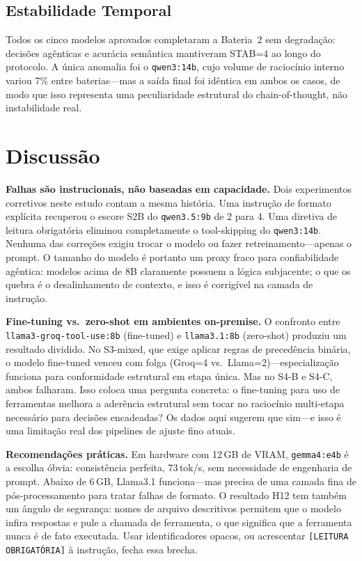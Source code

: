 \documentclass{kdmile}
\begin{document}
\subsection{Estabilidade Temporal}

Todos os cinco modelos aprovados completaram a Bateria~2 sem degradação:
decisões agênticas e acurácia semântica mantiveram STAB=4 ao longo do protocolo.
A única anomalia foi o \texttt{qwen3:14b}, cujo volume de raciocínio interno
variou 7\% entre baterias—\allowbreak mas a saída final foi idêntica em ambos os casos,
de modo que isso representa uma peculiaridade estrutural do chain-of-thought,
não instabilidade real.

\section{Discussão}
\label{sec:discussion}

\textbf{Falhas são instrucionais, não baseadas em capacidade.}
Dois experimentos corretivos neste estudo contam a mesma história.
Uma instrução de formato explícita recuperou o escore S2B do \texttt{qwen3.5:9b}
de 2 para 4. Uma diretiva de leitura obrigatória eliminou completamente o
tool-skipping do \texttt{qwen3:14b}.
Nenhuma das correções exigiu trocar o modelo ou fazer retreinamento—\allowbreak apenas o
prompt.
O tamanho do modelo é portanto um proxy fraco para confiabilidade agêntica:
modelos acima de 8B claramente possuem a lógica subjacente; o que os quebra é
o desalinhamento de contexto, e isso é corrigível na camada de instrução.

\textbf{Fine-tuning vs.\ zero-shot em ambientes on-premise.}
O confronto entre \texttt{llama3-groq-\allowbreak tool-\allowbreak use:8b} (fine-tuned) e
\texttt{llama3.1:8b} (zero-shot) produziu um resultado dividido.
No S3-mixed, que exige aplicar regras de precedência binária, o modelo
fine-tuned venceu com folga (Groq=4 vs.\ Llama=2)—\allowbreak especialização funciona para
conformidade estrutural em etapa única.
Mas no S4-B e S4-C, ambos falharam.
Isso coloca uma pergunta concreta: o fine-tuning para uso de ferramentas melhora
a aderência estrutural sem tocar no raciocínio multi-etapa necessário para
decisões encadeadas? Os dados aqui sugerem que sim—\allowbreak e isso é uma limitação real
dos pipelines de ajuste fino atuais.

\textbf{Recomendações práticas.}
Em hardware com 12\,GB de VRAM, \texttt{gemma4:e4b} é a escolha óbvia:
consistência perfeita, 73\,tok/s, sem necessidade de engenharia de prompt.
Abaixo de 6\,GB, Llama3.1 funciona—\allowbreak mas precisa de uma camada fina de
pós-processamento para tratar falhas de formato.
O resultado H12 tem também um ângulo de segurança: nomes de arquivo descritivos
permitem que o modelo infira respostas e pule a chamada de ferramenta, o que
significa que a ferramenta nunca é de fato executada.
Usar identificadores opacos, ou acrescentar \texttt{[LEITURA OBRIGATÓRIA]} à
instrução, fecha essa brecha.
\end{document}
